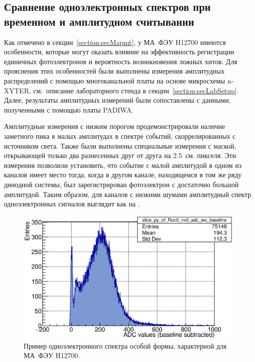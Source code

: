 \subsection{Сравнение одноэлектронных спектров при временном и амплитудном считывании}\label{section:secNxVsPadiwa}

Как отмечено в секции~\ref{section:secMapmt}, у МА~ФЭУ H12700 имеются особенности, которые могут оказать влияние на эффективность регистрации единичных фотоэлектронов и вероятность возникновения ложных хитов. Для прояснения этих особенностей были выполнены измерения амплитудных распределений с помощью многоканальной платы на основе микросхемы n-XYTER, см.~описание лабораторного стенда в секции~\ref{section:secLabSetup}. Далее, результаты амплитудных измерений были сопоставлены с данными, полученными с помощью платы PADIWA.

Амплитудные измерения с низким порогом продемонстрировали наличие заметного пика в малых амплитудах в спектре событий, скоррелированных с источником света. Также были выполнены специальные измерения с маской, открывающей только два разнесенных друг от друга на 2.5~см. пикселя. Эти измерения позволили установить, что событие с малой амплитудой в одном из каналов имеет место тогда, когда в другом канале, находящемся в том же ряду динодной системы, был зарегистрирован фотоэлектрон с достаточно большой амплитудой. Таким образом, для каналов с низкими шумами амплитудный спектр одноэлектронных сигналов выглядит как на .

\begin{figure}
\includegraphics[width=1.0\textwidth]{pictures/30_PeculiarSpectrum.eps}
\caption{Пример одноэлектронного спектра особой формы, характерной для МА~ФЭУ H12700.}
\label{fig:PeculiarSpectrum}
\end{figure}

